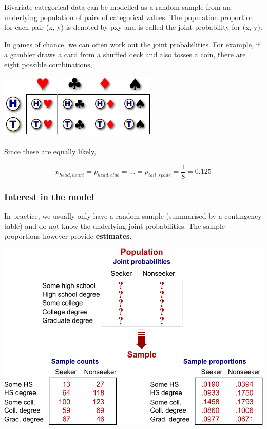 \documentclass[11pt]{article}
\begin{document}
Bivariate categorical data can be modelled as a random sample from an underlying population of pairs of categorical values. The population proportion for each pair (x, y) is denoted by pxy and is called the joint probability for (x, y).

In games of chance, we can often work out the joint probabilities. For example, if a gambler draws a card from a shuffled deck and also tosses a coin, there are eight possible combinations,

\begin{center}
\includegraphics[scale=0.75]{images/prob/cardAndCoin}
\end{center}

Since these are equally likely,

\[p_{head, heart}  =  p_{head, club}  =  ...  =  p_{tail, spade}  =  \frac 18  =  0.125 \]

\subsubsection*{Interest in the model}

In practice, we usually only have a random sample (summarised by a contingency table) and do not know the underlying joint probabilities. The sample proportions however provide \textbf{estimates}.

\begin{center}
\includegraphics[scale=0.75]{images/prob/seekers}
\end{center}
\end{document}
